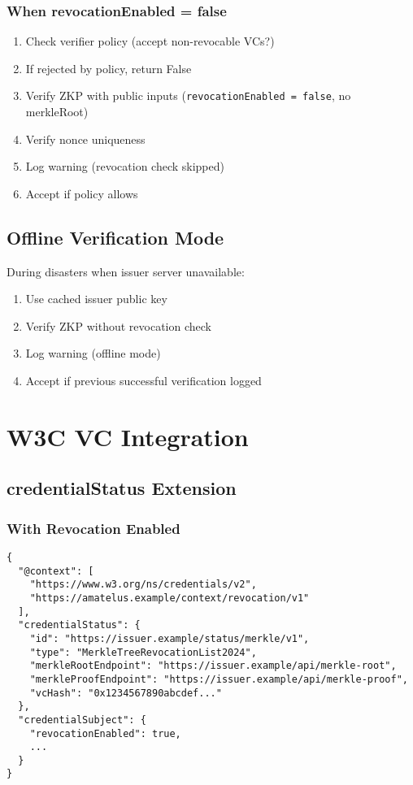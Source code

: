 \subsubsection{When revocationEnabled = false}

\begin{enumerate}
  \item Check verifier policy (accept non-revocable VCs?)
  \item If rejected by policy, return False
  \item Verify ZKP with public inputs (\texttt{revocationEnabled = false}, no merkleRoot)
  \item Verify nonce uniqueness
  \item Log warning (revocation check skipped)
  \item Accept if policy allows
\end{enumerate}

\subsection{Offline Verification Mode}

During disasters when issuer server unavailable:

\begin{enumerate}
  \item Use cached issuer public key
  \item Verify ZKP without revocation check
  \item Log warning (offline mode)
  \item Accept if previous successful verification logged
\end{enumerate}

\section{W3C VC Integration}

\subsection{credentialStatus Extension}

\subsubsection{With Revocation Enabled}

\begin{verbatim}
{
  "@context": [
    "https://www.w3.org/ns/credentials/v2",
    "https://amatelus.example/context/revocation/v1"
  ],
  "credentialStatus": {
    "id": "https://issuer.example/status/merkle/v1",
    "type": "MerkleTreeRevocationList2024",
    "merkleRootEndpoint": "https://issuer.example/api/merkle-root",
    "merkleProofEndpoint": "https://issuer.example/api/merkle-proof",
    "vcHash": "0x1234567890abcdef..."
  },
  "credentialSubject": {
    "revocationEnabled": true,
    ...
  }
}
\end{verbatim}

